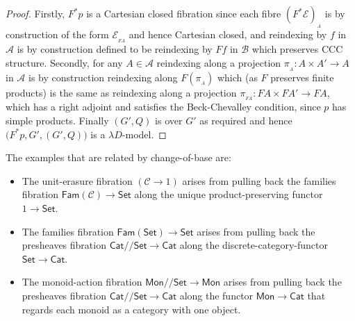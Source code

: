 \documentclass[a4paper,UKenglish]{lipics}
\newcommand{\msf}[1]{\mathsf{#1}} %
\newcommand{\Mon}{\msf{Mon}}
\newcommand{\Set}{\msf{Set}}
\newcommand{\Cat}{\msf{Cat}}
\newcommand{\Fam}[1]{\msf{Fam}(#1)}
\newcommand{\A}{\mathcal{A}}
\newcommand{\B}{\mathcal{B}}
\newcommand{\C}{\mathcal{C}}
\newcommand{\E}{\mathcal{E}}
\newcommand{\fibre}[2]{#1_{_{#2}}}
\newcommand{\fibreE}[1]{\E_{_{#1}}}
\newcommand{\GroupSet}[1]{#1/\!/\Set}
\newcommand{\MonSet}{\GroupSet{\Mon}}
\newcommand{\CatSet}{\GroupSet{\Cat}}
\newcommand{\bbracket}[1]{\bigl( #1 \bigr)}
\begin{document}
\begin{proof}
Firstly, $F^*p$ is a Cartesian closed fibration since each fibre $\fibre{(F^*\E)}{A}$ is by construction of the form $\fibreE{FA}$ and hence Cartesian closed, and  reindexing by $f$ in $\A$ is by construction defined to be reindexing by $Ff$ in $\B$ which preserves CCC structure. Secondly, for any $A \in \A$ reindexing along a projection $\pi_{_{A}}: A \times A' \rightarrow A$ in $\A$ is by construction reindexing along $F(\pi_{_{A}})$ which (as $F$ preserves finite products) is the same as reindexing along a projection $\pi_{_{FA}} : FA \times FA' \rightarrow FA$, which has a right adjoint and satisfies the Beck-Chevalley condition, since $p$ has simple products. Finally $(G', Q)$ is over $G'$ as required and hence $\bbracket{F^{\ast}p, G', (G',Q)}$ is a $\lambda D$-model.
\end{proof}

\noindent The examples that are related by change-of-base are:
\begin{itemize}
\item The unit-erasure fibration $(\C\to 1)$ arises from pulling back the families fibration
$\Fam\C\to\Set$ along the unique product-preserving functor $1\to\Set$.
\item The families fibration $\Fam\Set\to\Set$ arises from pulling back the presheaves fibration
$\CatSet\to\Cat$ along the discrete-category-functor $\Set\to\Cat$.
\item The monoid-action fibration $\MonSet\to\Mon$ arises from pulling
  back the presheaves fibration $\CatSet\to\Cat$ along the functor
  $\Mon\to\Cat$ that regards each monoid as a category with one
  object.
\end{itemize}
\end{document}

